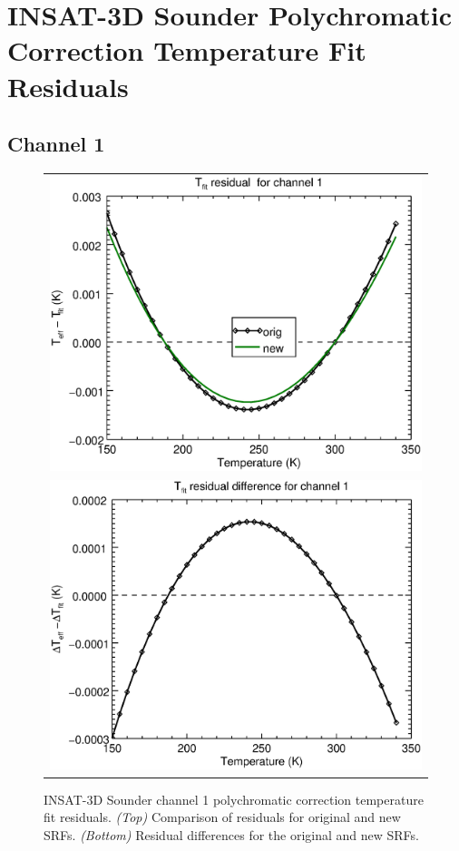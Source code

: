 \section{INSAT-3D Sounder Polychromatic Correction Temperature Fit Residuals}
\label{app.sndr_tfit_data_plots}

\subsection{Channel 1}
\begin{figure}[H]
  \centering
  \begin{tabular}{c}
    \includegraphics[scale=0.55]{graphics/sndr/tfit/sndr_insat3d-1.tfit.eps} \\
    \includegraphics[scale=0.55]{graphics/sndr/tfit/sndr_insat3d-1.tfit.difference.eps}
  \end{tabular}
  \caption{INSAT-3D Sounder channel 1 polychromatic correction temperature fit residuals. \emph{(Top)} Comparison of residuals for original and new SRFs. \emph{(Bottom)} Residual differences for the original and new SRFs.}
  \label{fig:sndr_ch1_tfit}
\end{figure}


